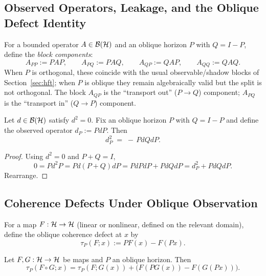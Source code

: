 \subsection{Observed Operators, Leakage, and the Oblique Defect Identity}
\label{subsec:oblique-horizons-defect}

\begin{definition}
\label{def:oblique-compression}
For a bounded operator $A\in \mathcal{B}(\mathcal{H})$ and an oblique horizon $P$ with $Q=I-P$, define the \emph{block components}:
\[
A_{PP} := PAP,\qquad
A_{PQ} := PAQ,\qquad
A_{QP} := QAP,\qquad
A_{QQ} := QAQ.
\]
When $P$ is orthogonal, these coincide with the usual observable/shadow blocks of Section~\ref{sec:hft}; when $P$ is oblique they remain algebraically valid but the split is not orthogonal.
The block $A_{QP}$ is the ``transport out'' ($P\to Q$) component; $A_{PQ}$ is the ``transport in'' ($Q\to P$) component.
\end{definition}

\begin{theorem}
\label{thm:oblique-hft1}
Let $d\in \mathcal{B}(\mathcal{H})$ satisfy $d^2=0$.
Fix an oblique horizon $P$ with $Q=I-P$ and define the observed operator $d_P := PdP$.
Then
\[
d_P^2 \;=\; -\,PdQdP.
\]
\end{theorem}

\begin{proof}
Using $d^2=0$ and $P+Q=I$,
\[
0 = Pd^2P = Pd(P+Q)dP = PdPdP + PdQdP = d_P^2 + PdQdP.
\]
Rearrange.
\end{proof}

\subsection{Coherence Defects Under Oblique Observation}
\label{subsec:oblique-horizons-defect-calculus}

\begin{definition}
\label{def:oblique-coherence-defect}
For a map $F:\mathcal{H}\to \mathcal{H}$ (linear or nonlinear, defined on the relevant domain), define the oblique coherence defect at $x$ by
\[
\tau_{P}(F;x) := PF(x) - F(Px).
\]
\end{definition}

\begin{proposition}
\label{prop:oblique-chain-rule}
Let $F,G:\mathcal{H}\to \mathcal{H}$ be maps and $P$ an oblique horizon. Then
\[
\tau_P(F\circ G; x) = \tau_P(F;G(x)) + \Big(F(PG(x)) - F(G(Px))\Big).
\]
\end{proposition}


